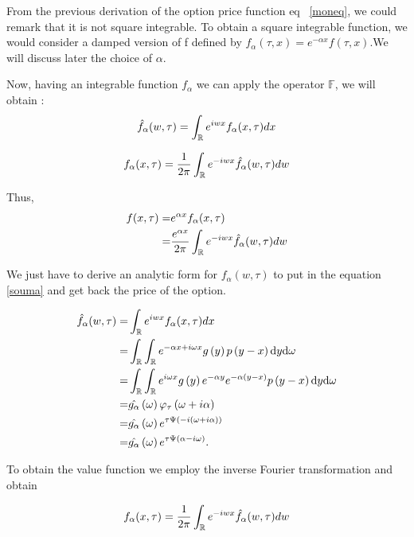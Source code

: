 \documentclass[12pt]{report}
\begin{document}
From the previous derivation of the option price function eq ~\eqref{moneq}, we could remark that it is not square integrable. To obtain a square integrable function, we would consider a damped version of f defined by $f_{\alpha}(\tau,x) = e^{-\alpha x}f(\tau, x)$.We will discuss later  the choice of $\alpha$.

Now, having an integrable function $f_\alpha$ we can apply the operator $\mathbb{F}$, we will obtain :
\begin{gather}
\hat{f}_{\alpha}(w,\tau)=\int_{\mathbb{R}} e^{iwx} f_{\alpha}(x,\tau) dx 
\end{gather}


\begin{equation}
f_{\alpha}(x,\tau)=\frac{1}{2\pi}\int_{\mathbb{R}} e^{-iwx}\hat{f}_{\alpha}(w,\tau) dw
\end{equation}

Thus,\\
\begin{align}
f(x,\tau)= & e^{\alpha x} f_{\alpha}(x,\tau)\\
= & \frac{e^{\alpha x}}{2\pi}\int_{\mathbb{R}} e^{-iwx}\hat{f}_{\alpha}(w,\tau) dw
\label{souma}
\end{align}

We just have to derive an analytic form for $f_\alpha(w,\tau)$ to put in the equation \eqref{souma} and get back the price of the option.

\begin{align*}
\hat{f}_{\alpha}(w,\tau)= &\int_{\mathbb{R}} e^{iwx} f_{\alpha}(x,\tau) dx
\\
= &  \int_{\mathbb{R}} \int_{\mathbb{R}} e^{- \alpha x + i \omega x} g \left( {y} \right)  p \left( {y-x} \right) \textrm{d} y \textrm{d} \omega
\\
= & \int_{\mathbb{R}} \int_{\mathbb{R}} e^{ i \omega x} g \left( {y} \right) e^{-\alpha y} e^{-\alpha \left( {y
-x} \right)}  p \left( {y-x} \right) \textrm{d} y \textrm{d} \omega
\\
= &\hat {g_{\alpha}} \left( {\omega} \right) \varphi_{\tau} \left( {{\omega + i \alpha}} \right)
\\
= & \hat {g_{\alpha}} \left( {\omega} \right) e^{\tau \Psi \left( {{-i \left( {\omega+i \alpha} \right)}} \right) }
\\
= & \hat {g_{\alpha}} \left( {\omega} \right) e^{\tau \Psi \left( {{\alpha - i \omega}} \right) }.
\end{align*}

To obtain the value function we employ the inverse Fourier transformation and
obtain

\begin{equation}
f_{\alpha}(x,\tau)=\frac{1}{2\pi}\int_{\mathbb{R}} e^{-iwx}\hat{f}_{\alpha}(w,\tau) dw
\end{equation}
\end{document}
